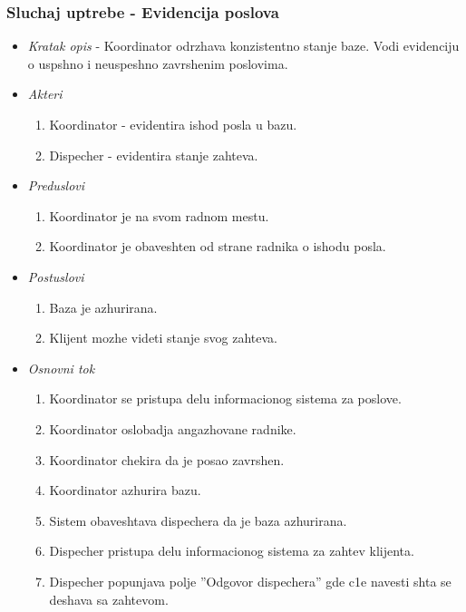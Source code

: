 \documentclass[10 pt]{article}
\begin{document}
	\subsubsection{Sluchaj uptrebe - Evidencija poslova}
	
		\begin{itemize}
			\item\textit{Kratak opis} - Koordinator odrzhava konzistentno stanje baze. Vodi evidenciju o uspshno i neuspeshno zavrshenim poslovima.
			
			\item\textit{Akteri}
				\begin{enumerate}
					\item Koordinator - evidentira ishod posla u bazu.
					\item Dispecher - evidentira stanje zahteva.
				\end{enumerate}
			
			\item\textit{Preduslovi}
				\begin{enumerate}
					\item Koordinator je na svom radnom mestu.
					\item Koordinator je obaveshten od strane radnika o ishodu posla.
				\end{enumerate}
		
			\item\textit{Postuslovi}
				\begin{enumerate}
					\item Baza je azhurirana. 
					\item Klijent mozhe videti stanje svog zahteva.
				\end{enumerate}
		
			\item\textit{Osnovni tok}
				\begin{enumerate}
					\item Koordinator se pristupa delu informacionog sistema za poslove.
					\item Koordinator oslobadja angazhovane radnike.
					\item Koordinator chekira da je posao zavrshen.
					\item Koordinator azhurira bazu.
					\item Sistem obaveshtava dispechera da je baza azhurirana.
					\item Dispecher pristupa delu informacionog sistema za zahtev klijenta.
					\item Dispecher popunjava polje ''Odgovor dispechera'' gde c1e navesti shta se deshava sa zahtevom.				
				\end{enumerate}
			

\end{itemize}
\end{document}
